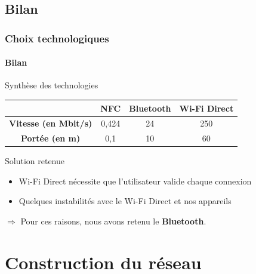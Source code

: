 \documentclass{beamer}
\begin{document}
    \subsection{Bilan}
    \begin{frame}
      \frametitle{Choix technologiques}
      \framesubtitle{Bilan}
      \begin{small}
        \begin{block}{Synthèse des technologies}
          \begin{table}
            \begin{center}
              \begin{tabular}{|c|c|c|c|}
                \hline
                & \textbf{NFC} & \textbf{Bluetooth} & \textbf{Wi-Fi Direct} \\
                \hline
                \textbf{Vitesse (en Mbit/s)} & 0,424 & 24 & 250 \\
                \hline
                \textbf{Portée (en m)} & 0,1 & 10 & 60 \\
                \hline
              \end{tabular}
            \end{center}
          \end{table}
        \end{block}
        \begin{block}{Solution retenue}
          \begin{itemize}
            \item Wi-Fi Direct nécessite que l'utilisateur valide chaque connexion
            \item Quelques instabilités avec le Wi-Fi Direct et nos appareils
          \end{itemize}
          \begin{center}
            $ \Rightarrow $ Pour ces raisons, nous avons retenu le \textbf{Bluetooth}.
          \end{center}
        \end{block}
      \end{small}
    \end{frame}
  
  \section{Construction du réseau}
  \begin{frame}
    \setcounter{tocdepth}{2}
    \tableofcontents[currentsection]
  \end{frame}
\end{document}
